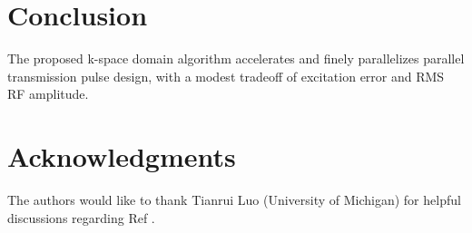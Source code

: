 \section*{Conclusion}
The proposed k-space domain algorithm accelerates and finely parallelizes parallel transmission pulse design,
with a modest tradeoff of excitation error and RMS RF amplitude.


\section*{Acknowledgments}
The authors would like to thank Tianrui Luo (University of Michigan) for helpful discussions regarding Ref \cite{luo2019grappa}.